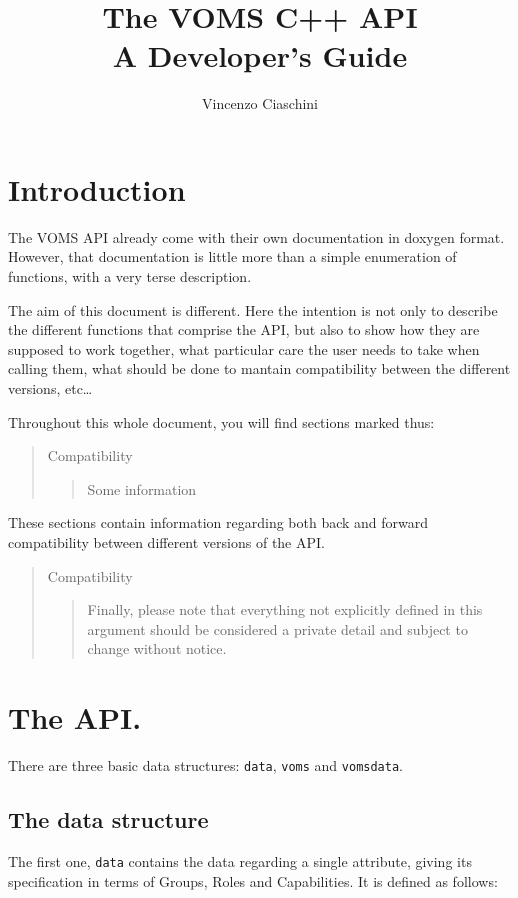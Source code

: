 \documentclass[a4paper]{book}
\newenvironment{compatibility}{\begin{quote}\color{red}Compatibility\begin{quote}}{\end{quote}\color{black}\end{quote}}
\begin{document}
\lstset{language=C++}
\begin{titlepage}
\title{The VOMS C++ API\\ A Developer's Guide}
\author{Vincenzo Ciaschini}
\end{titlepage}
\maketitle
\tableofcontents
\newpage
\chapter{Introduction}
The VOMS API already come with their own documentation in doxygen
format.  However, that documentation is little more than a simple
enumeration of functions, with a very terse description.

The aim of this document is different.  Here the intention is not only
to describe the different functions that comprise the API, but also to
show how they are supposed to work together, what particular care the
user needs to take when calling them, what should be done to mantain
compatibility between the different versions, etc\ldots

Throughout this whole document, you will find sections marked thus:
\begin{compatibility}
Some information
\end{compatibility}
These sections contain information regarding both back and forward
compatibility between different versions of the API.

\begin{compatibility}
Finally, please note that everything not explicitly defined in this
argument should be considered a private detail and subject to change
without notice.
\end{compatibility}

\chapter{The API.}
There are three basic data structures: \verb|data|\/, \verb|voms|
and \verb|vomsdata|.

\section{The data structure}
The first one, \verb|data| contains the data regarding a single
attribute, giving its specification in terms of Groups, Roles and
Capabilities. It is defined as follows:
\end{document}
